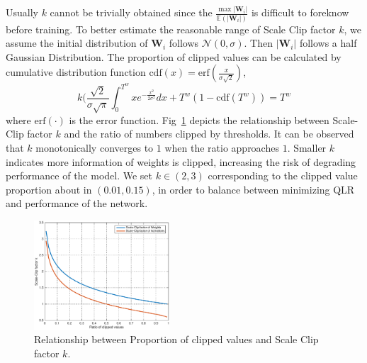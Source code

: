 \documentclass[letterpaper]{article} %
\begin{document}
Usually $k$ cannot be trivially obtained since the $\frac{\max|\mathbf{W}_i|}{\mathbb{E}(|{\mathbf{W}_{i}}|)}$ is difficult to foreknow before training. To better estimate the reasonable range of Scale Clip factor $k$, we assume the initial distribution of $\mathbf{W}_{i}$ follows $\mathcal{N}(0, \sigma)$. Then $|\mathbf{W}_{i}|$ follows a half Gaussian Distribution. The proportion of clipped values can be calculated by cumulative distribution function $\text{cdf}(x)=\text{erf}(\frac{x}{\sigma \sqrt{2}})$, 
\begin{equation}
k(\frac{\sqrt{2}}{\sigma \sqrt{\pi}}\int_{0}^{
T^w}xe^{-\frac{x^2}{2\sigma^2}}dx + T^w(1-\text{cdf}(T^w))=T^w
\end{equation}
where $\text{erf}(\cdot)$ is the error function. Fig~\ref{fig:scale-factor} depicts the relationship between Scale-Clip factor $k$ and the ratio of numbers clipped by thresholds. It can be observed that $k$ monotonically converges to $1$ when the ratio approaches $1$. Smaller $k$ indicates more information of weights is clipped, increasing the risk of degrading performance of the model. We set $k \in (2,3)$ corresponding to the clipped value proportion about in $(0.01, 0.15)$, in order to balance between minimizing QLR and performance of the network.
\begin{figure}[ht!]
	\includegraphics[width=0.45\textwidth]{scale-factor.eps}
	\caption{Relationship between Proportion of clipped values and Scale Clip factor $k$.}\label{fig:scale-factor}
\end{figure}


\end{document}
